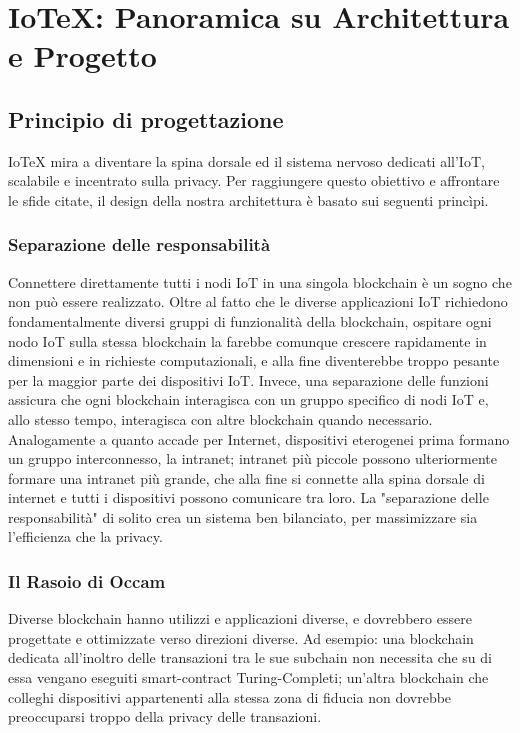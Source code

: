 \section{IoTeX: Panoramica su Architettura e Progetto}

\subsection{Principio di progettazione}
IoTeX mira a diventare la spina dorsale ed il sistema nervoso dedicati all'IoT, scalabile e incentrato sulla privacy. Per raggiungere questo obiettivo e affrontare le sfide citate, il design della nostra architettura è basato sui seguenti princìpi.

\subsubsection{Separazione delle responsabilità}
Connettere direttamente tutti i nodi IoT in una singola blockchain è un sogno che non può essere realizzato. Oltre al fatto che le diverse applicazioni IoT richiedono fondamentalmente diversi gruppi di funzionalità della blockchain, ospitare ogni nodo IoT sulla stessa blockchain la farebbe comunque crescere rapidamente in dimensioni e in richieste computazionali, e alla fine diventerebbe troppo pesante per la maggior parte dei dispositivi IoT. Invece, una separazione delle funzioni assicura che ogni blockchain interagisca con un gruppo specifico di nodi IoT e, allo stesso tempo, interagisca con altre blockchain quando necessario. Analogamente a quanto accade per Internet, dispositivi eterogenei prima formano un gruppo interconnesso, la intranet; intranet più piccole possono ulteriormente formare una intranet più grande, che alla fine si connette alla spina dorsale di internet e tutti i dispositivi possono comunicare tra loro.
La "separazione delle responsabilità" di solito crea un sistema ben bilanciato, per massimizzare sia l'efficienza che la privacy.

\subsubsection{Il Rasoio di Occam}
Diverse blockchain hanno utilizzi e applicazioni diverse, e dovrebbero essere progettate e ottimizzate verso direzioni diverse. Ad esempio: una blockchain dedicata all'inoltro delle transazioni tra le sue subchain non necessita che su di essa vengano eseguiti smart-contract Turing-Completi; un'altra blockchain che colleghi dispositivi appartenenti alla stessa zona di fiducia non dovrebbe preoccuparsi troppo della privacy delle transazioni.

